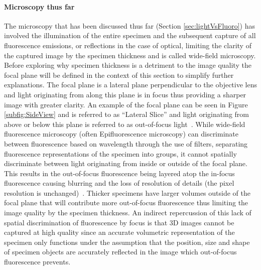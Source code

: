 \paragraph{Microscopy thus far} The microscopy that has been discussed thus far (Section \ref{sec:lightVsFluoro}) has involved the illumination of the entire specimen and the subsequent capture of all fluorescence emissions, or reflections in the case of optical, limiting the clarity of the captured image by the specimen thickness and is called wide-field microscopy. Before exploring why specimen thickness is a detriment to the image quality the focal plane will be defined in the context of this section to simplify further explanations. The focal plane is a lateral plane perpendicular to the objective lens and light originating from along this plane is in focus thus providing a sharper image with greater clarity. An example of the focal plane can be seen in Figure \ref{subfig:SideView} and is referred to as ``Lateral Slice'' and light originating from above or below this plane is referred to as out-of-focus light~\cite{Sanderson-2014}. While wide-field fluorescence microscopy (often Epifluorescence microscopy) can discriminate between fluorescence based on wavelength through the use of filters, separating fluorescence representations of the specimen into groups, it cannot spatially discriminate between light originating from inside or outside of the focal plane. This results in the out-of-focus fluorescence being layered atop the in-focus fluorescence causing blurring and the loss of resolution of details (the pixel resolution is unchanged)~\cite{Sanderson-2014, confocal_modern}. Thicker specimens have larger volumes outside of the focal plane that will contribute more out-of-focus fluorescence thus limiting the image quality by the specimen thickness. An indirect repercussion of this lack of spatial discrimination of fluorescence by focus is that 3D images cannot be captured at high quality since an accurate volumetric representation of the specimen only functions under the assumption that the position, size and shape of specimen objects are accurately reflected in the image which out-of-focus fluorescence prevents.

